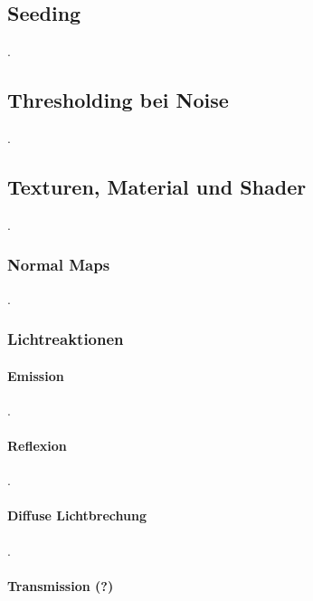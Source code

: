 \subsection{Seeding}

.

\subsection{Thresholding bei Noise}

.




\subsection{Texturen, Material und Shader}
\label{sec:material_texturen}

.

\subsubsection{Normal Maps}

.

\subsubsection{Lichtreaktionen}

\paragraph{Emission}

.

\paragraph{Reflexion}

.

\paragraph{Diffuse Lichtbrechung}

.

\paragraph{Transmission (?)}

